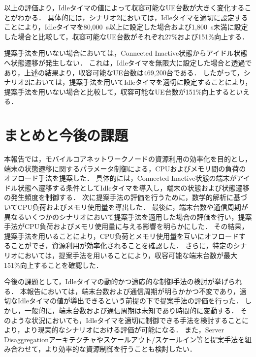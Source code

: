 \documentclass[technicalreport]{ieicej-rev}
\begin{document}
以上の評価より，Idleタイマの値によって収容可能なUE台数が大きく変化することがわかる．
具体的には，シナリオ2においては，Idleタイマを適切に設定することにより，Idleタイマを80,000~s以上に設定した場合および1,800~s未満に設定した場合と比較して，収容可能なUE台数がそれぞれ27\%および151\%向上する．

提案手法を用いない場合においては，Connected Inactive状態からアイドル状態へ状態遷移が発生しない．
これは，Idleタイマを無限大に設定した場合と透過であり，上述の結果より，収容可能なUE台数は469,200台である．
したがって，シナリオ2においては，提案手法を用いてIdleタイマを適切に設定することにより，提案手法を用いない場合と比較して，収容可能なUE台数が151\%向上するといえる．

\section{まとめと今後の課題}
\label{sec:まとめと今後の課題}
本報告では，モバイルコアネットワークノードの資源利用の効率化を目的とし，端末の状態遷移に関するパラメータ制御による，CPUおよびメモリ間の負荷のオフロード手法を提案した．
具体的には，Connected Inactive状態の端末がアイドル状態へ遷移する条件としてIdleタイマを導入し，端末の状態および状態遷移の発生頻度を制御する．
次に提案手法の評価を行うために，数学的解析に基づいてCPU負荷およびメモリ使用量を導出した．
最後に，端末台数や通信周期が異なるいくつかのシナリオにおいて提案手法を適用した場合の評価を行い，提案手法がCPU負荷およびメモリ使用量に与える影響を明らかにした．
その結果，提案手法を用いることにより，CPU負荷とメモリ使用量を互いにオフロードすることができ，資源利用が効率化されることを確認した．
さらに，特定のシナリオにおいては，提案手法を用いることにより，収容可能な端末台数が最大151\%向上することを確認した．

今後の課題として，Idleタイマの動的かつ適応的な制御手法の検討が挙げられる．
本報告においては，端末台数および通信周期が明らかかつ不変であり，適切なIdleタイマの値が導出できるという前提の下で提案手法の評価を行った．
しかし，一般的に，端末台数および通信周期は未知であり時間的に変動する．
そのような状況においても，Idleタイマを適切に制御できる手法を検討することにより，より現実的なシナリオにおける評価が可能になる．
また，Server Disaggregationアーキテクチャやスケールアウト/スケールイン等と提案手法を組み合わせて，より効率的な資源制御を行うことも検討したい．
\end{document}
